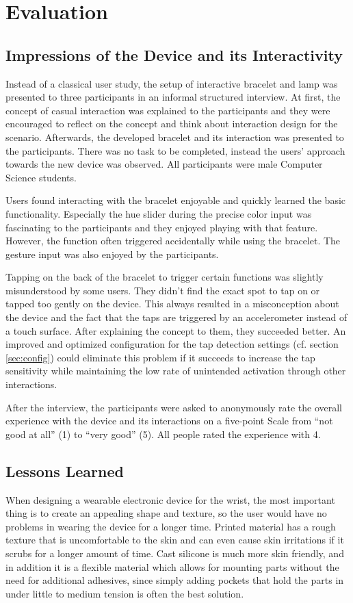 \chapter{Evaluation}
\label{chap:evaluation}
\section{Impressions of the Device and its Interactivity}
Instead of a classical user study, the setup of interactive bracelet and lamp was presented to three participants in an informal structured interview. At first, the concept of casual interaction was explained to the participants and they were encouraged to reflect on the concept and think about interaction design for the scenario. Afterwards, the developed bracelet and its interaction was presented to the participants. There was no task to be completed, instead the users' approach towards the new device was observed. All participants were male Computer Science students.

Users found interacting with the bracelet enjoyable and quickly learned the basic functionality. Especially the hue slider during the precise color input was fascinating to the participants and they enjoyed playing with that feature. However, the function often triggered accidentally while using the bracelet. The gesture input was also enjoyed by the participants.

Tapping on the back of the bracelet to trigger certain functions was slightly misunderstood by some users. They didn't find the exact spot to tap on or tapped too gently on the device. This always resulted in a misconception about the device and the fact that the taps are triggered by an accelerometer instead of a touch surface. After explaining the concept to them, they succeeded better. An improved and optimized configuration for the tap detection settings (cf. section \ref{sec:config}) could eliminate this problem if it succeeds to increase the tap sensitivity while maintaining the low rate of unintended activation through other interactions.

After the interview, the participants were asked to anonymously rate the overall experience with the device and its interactions on a five-point Scale from ``not good at all'' (1) to ``very good'' (5). All people rated the experience with 4.

\section{Lessons Learned}
When designing a wearable electronic device for the wrist, the most important thing is to create an appealing shape and texture, so the user would have no problems in wearing the device for a longer time. Printed material has a rough texture that is uncomfortable to the skin and can even cause skin irritations if it scrubs for a longer amount of time. Cast silicone is much more skin friendly, and in addition it is a flexible material which allows for mounting parts without the need for additional adhesives, since simply adding pockets that hold the parts in under little to medium tension is often the best solution.

